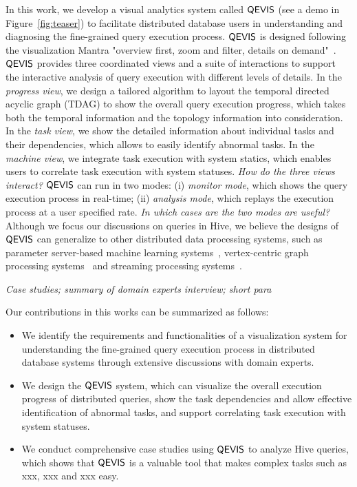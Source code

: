 In this work, we develop a visual analytics system called $\mathsf{QEVIS}$ (see a demo in Figure~\ref{fig:teaser}) to facilitate distributed database users in understanding and diagnosing the fine-grained query execution process. $\mathsf{QEVIS}$ is designed following the visualization Mantra "overview first, zoom and filter, details on demand"~\cite{shneiderman2003eyes}. $\mathsf{QEVIS}$ provides three coordinated views and a suite of interactions to support the interactive analysis of query execution with different levels of details. In the \textit{progress view}, we design a tailored algorithm to layout the temporal directed acyclic graph (TDAG) to show the overall query execution progress, which takes both the temporal information and the topology information into consideration. In the \textit{task view}, we show the detailed information about individual tasks and their dependencies, which allows to easily identify abnormal tasks. In the \textit{machine view}, we integrate task execution with system statics, which enables users to correlate task execution with system statuses.\textit{ How do the three views interact?}
$\mathsf{QEVIS}$ can run in two modes: (i) \textit{monitor mode}, which shows the query execution process in real-time; (ii) \textit{analysis mode}, which replays the execution process at a user specified rate. \textit{ In which cases are the two modes are useful?} Although we focus our discussions on queries in Hive, we believe the designs of $\mathsf{QEVIS}$ can generalize to other distributed data processing systems, such as parameter server-based machine learning systems~\cite{}, vertex-centric graph processing systems~\cite{} and streaming processing systems~\cite{}.   

\textit{Case studies; summary of domain experts interview; short para}

Our contributions in this works can be summarized as follows:
\begin{itemize}
	\item We identify the requirements and functionalities of a visualization system for understanding the fine-grained query execution process in distributed database systems through extensive discussions with domain experts.   
	\item We design the $\mathsf{QEVIS}$ system, which can visualize the overall execution progress of distributed queries, show the task dependencies and allow effective identification of abnormal tasks, and support correlating task execution with system statuses.
	\item We conduct comprehensive case studies using $\mathsf{QEVIS}$ to analyze Hive queries, which shows that $\mathsf{QEVIS}$ is a valuable tool that makes complex tasks such as xxx, xxx and xxx easy.
\end{itemize}


